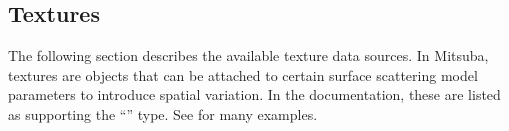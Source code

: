 \newpage
\subsection{Textures}
\label{sec:textures}
The following section describes the available texture data sources. In Mitsuba,
textures are objects that can be attached to certain
surface scattering model parameters to introduce spatial variation.
In the documentation, these are listed as supporting the ``\Texture'' type. 
See  for many examples.

